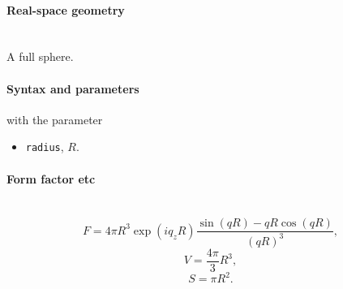 \paragraph{Real-space geometry}\strut\\
A full sphere.

\begin{figure}[h]
\hfill
{}
\hfill
{}
\hfill
{}
\hfill
\end{figure}

\FloatBarrier

\paragraph{Syntax and parameters}
\begin{quote}
\end{quote}
with the parameter
\begin{itemize}
\item \texttt{radius}, $R$.
\end{itemize}


\paragraph{Form factor etc}\strut\\
\begin{equation*}
F = 4\pi R^3 \exp(iq_z R)\frac{\sin(q R) - q R \cos(q R)}{(qR)^3},
\end{equation*}
\begin{equation*}
  V = \dfrac{4\pi}{3}R^3,
\end{equation*}
\begin{equation*}
  S= \pi R^2.
\end{equation*}

